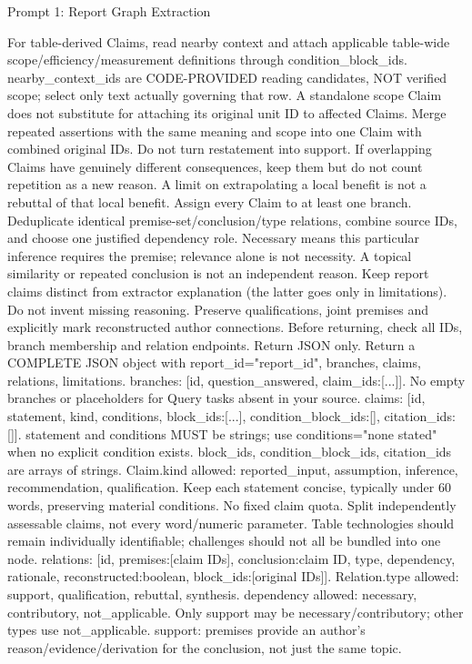 \documentclass{article}
\begin{document}
\begin{paperpromptbox}{Prompt 1: Report Graph Extraction}
\begin{PromptText}
For table-derived Claims, read nearby context and attach applicable table-wide scope/efficiency/measurement definitions through condition_block_ids. nearby_context_ids are CODE-PROVIDED reading candidates, NOT verified scope; select only text actually governing that row. A standalone scope Claim does not substitute for attaching its original unit ID to affected Claims.
Merge repeated assertions with the same meaning and scope into one Claim with combined original IDs. Do not turn restatement into support. If overlapping Claims have genuinely different consequences, keep them but do not count repetition as a new reason. A limit on extrapolating a local benefit is not a rebuttal of that local benefit.
Assign every Claim to at least one branch. Deduplicate identical premise-set/conclusion/type relations, combine source IDs, and choose one justified dependency role. Necessary means this particular inference requires the premise; relevance alone is not necessity. A topical similarity or repeated conclusion is not an independent reason.
Keep report claims distinct from extractor explanation (the latter goes only in limitations). Do not invent missing reasoning. Preserve qualifications, joint premises and explicitly mark reconstructed author connections. Before returning, check all IDs, branch membership and relation endpoints. Return JSON only.
Return a COMPLETE JSON object with report_id="{report_id}", branches, claims, relations, limitations. branches: [{id, question_answered, claim_ids:[...]}]. No empty branches or placeholders for Query tasks absent in your source. claims: [{id, statement, kind, conditions, block_ids:[...], condition_block_ids:[], citation_ids:[]}]. statement and conditions MUST be strings; use conditions="none stated" when no explicit condition exists. block_ids, condition_block_ids, citation_ids are arrays of strings. Claim.kind allowed: reported_input, assumption, inference, recommendation, qualification. Keep each statement concise, typically under 60 words, preserving material conditions.
No fixed claim quota. Split independently assessable claims, not every word/numeric parameter. Table technologies should remain individually identifiable; challenges should not all be bundled into one node.
relations: [{id, premises:[claim IDs], conclusion:claim ID, type, dependency, rationale, reconstructed:boolean, block_ids:[original IDs]}].
Relation.type allowed: support, qualification, rebuttal, synthesis. dependency allowed: necessary, contributory, not_applicable. Only support may be necessary/contributory; other types use not_applicable. support: premises provide an author's reason/evidence/derivation for the conclusion, not just the same topic.

\end{PromptText}
\end{paperpromptbox}
\end{document}
